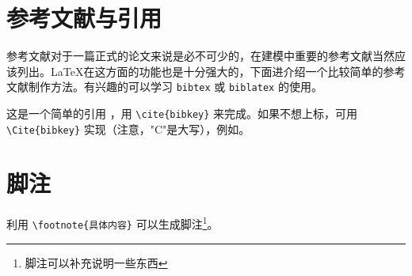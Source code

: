 \section{参考文献与引用}

参考文献对于一篇正式的论文来说是必不可少的，在建模中重要的参考文献当然应该列出。\LaTeX{}在这方面的功能也是十分强大的，下面进介绍一个比较简单的参考文献制作方法。有兴趣的可以学习 \verb|bibtex| 或 \verb|biblatex| 的使用。

这是一个简单的引用 \cite{zhangkun1994,zhukezhen1973}，用 \verb|\cite{bibkey}| 来完成。如果不想上标，可用 \verb|\Cite{bibkey}| 实现（注意，"C"是大写），例如\Cite{scitor2000project}。


\section{脚注}

利用 \verb|\footnote{具体内容}| 可以生成脚注\footnote{脚注可以补充说明一些东西}。
